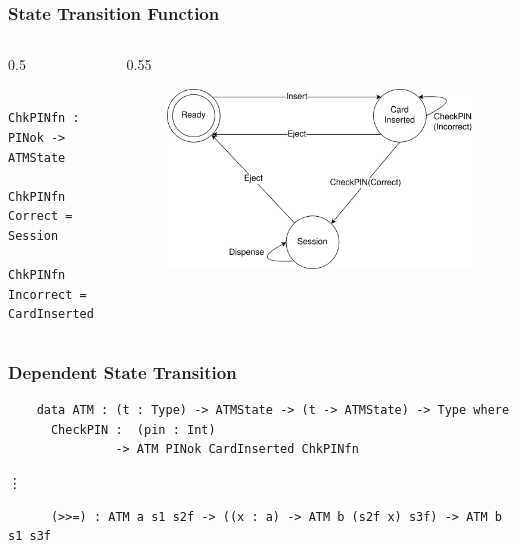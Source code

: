 \documentclass[compress,handout]{beamer}
\begin{document}
\begin{frame}[fragile]
  \frametitle{State Transition Function}

  \begin{columns}
  \begin{column}{0.5\framewidth}
    \begin{verbatim}
      ChkPINfn : PINok -> ATMState
      ChkPINfn Correct = Session
      ChkPINfn Incorrect = CardInserted
    \end{verbatim}
  \end{column}
  \hspace*{-7mm}
  \begin{column}{0.55\framewidth}
    \begin{figure}
    \includegraphics[alt={The state diagram from slide 7.},width=\textwidth]{ATM.png}
    \end{figure}
  \end{column}
  \end{columns}

\end{frame}


\begin{frame}[fragile]
  \frametitle{Dependent State Transition}

  \begin{verbatim}
    data ATM : (t : Type) -> ATMState -> (t -> ATMState) -> Type where
      CheckPIN :  (pin : Int)
               -> ATM PINok CardInserted ChkPINfn
  \end{verbatim}
  \vspace*{-5mm}
  \hspace*{1cm} \vdots
  \begin{verbatim}
      (>>=) : ATM a s1 s2f -> ((x : a) -> ATM b (s2f x) s3f) -> ATM b s1 s3f
  \end{verbatim}

\end{frame}
\end{document}
